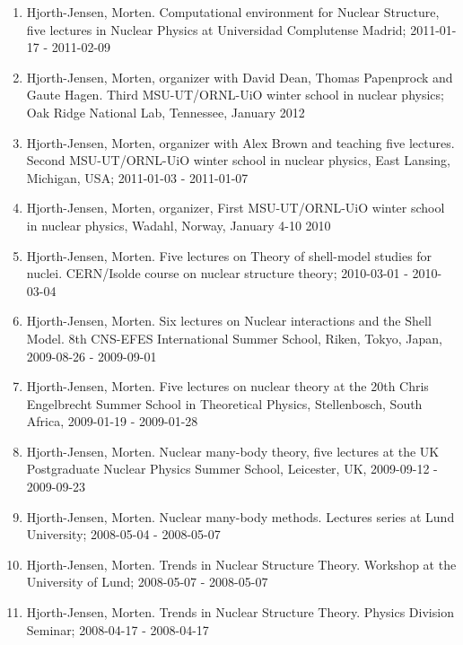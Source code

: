 \documentclass[%
oneside,                 %
final,                   %
10pt]{article}
\begin{document}
\begin{enumerate}
\item Hjorth-Jensen, Morten. Computational environment for Nuclear Structure, five lectures in Nuclear Physics at Universidad Complutense Madrid; 2011-01-17 - 2011-02-09

\item Hjorth-Jensen, Morten, organizer with David Dean, Thomas Papenprock and Gaute Hagen. Third MSU-UT/ORNL-UiO winter school in nuclear physics; Oak Ridge National Lab, Tennessee, January 2012

\item Hjorth-Jensen, Morten, organizer with Alex Brown and teaching five lectures. Second MSU-UT/ORNL-UiO winter school in nuclear physics, East Lansing, Michigan, USA; 2011-01-03 - 2011-01-07

\item Hjorth-Jensen, Morten, organizer, First MSU-UT/ORNL-UiO winter school in nuclear physics, Wadahl, Norway, January 4-10 2010

\item Hjorth-Jensen, Morten.  Five lectures on Theory of shell-model studies for nuclei. CERN/Isolde course on nuclear structure theory; 2010-03-01 - 2010-03-04

\item Hjorth-Jensen, Morten.  Six lectures on Nuclear interactions and the Shell Model. 8th CNS-EFES International Summer School, Riken, Tokyo, Japan, 2009-08-26 - 2009-09-01

\item Hjorth-Jensen, Morten.  Five lectures on nuclear theory at the  20th Chris Engelbrecht Summer School in Theoretical Physics, Stellenbosch, South Africa,  2009-01-19 - 2009-01-28

\item Hjorth-Jensen, Morten.  Nuclear many-body theory, five lectures at the  UK Postgraduate Nuclear Physics Summer School, Leicester, UK,  2009-09-12 - 2009-09-23

\item Hjorth-Jensen, Morten.  Nuclear many-body methods. Lectures series at Lund University; 2008-05-04 - 2008-05-07

\item Hjorth-Jensen, Morten.  Trends in Nuclear Structure Theory. Workshop at the University of Lund; 2008-05-07 - 2008-05-07

\item Hjorth-Jensen, Morten.  Trends in Nuclear Structure Theory. Physics Division Seminar; 2008-04-17 - 2008-04-17


\end{enumerate}
\end{document}
